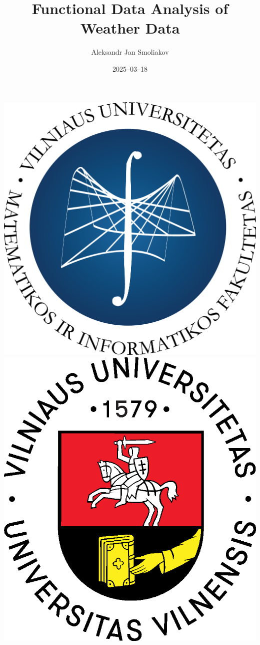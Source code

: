 \documentclass[svgnames, 12pt]{beamer}
\title[FDA of Weather Data]{Functional Data Analysis of Weather Data}%
\author[A. J. Smoliakov]{Aleksandr Jan Smoliakov\inst{1}}
\institute[VU MIF]{\inst{1} Vilnius University, Faculty of Mathematics and Informatics}
\date{2025--03--18}
\begin{document}
\begin{frame}
\includegraphics[scale=0.15]{MIF Garamond-logo.png} 
\hfill
\includegraphics[scale=0.15]{Logo_spalvotas.eps}

\titlepage
\end{frame}
\end{document}
